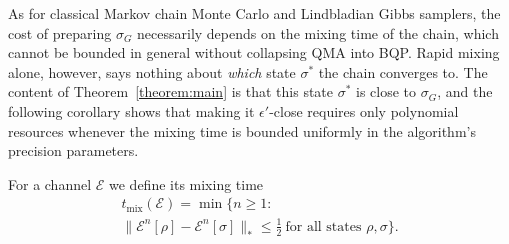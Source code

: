 \documentclass[aps,floatfix,10pt,amssymb,amsfont,amsmath,superscriptaddress,float,nofootinbib,longbibliography,nobalancelastpage,twocolumn]{revtex4-2}
\begin{document}
As for classical Markov chain Monte Carlo and Lindbladian Gibbs samplers, the cost of preparing $\sigma_G$ necessarily depends on the mixing time of the chain, which cannot be bounded in general without collapsing QMA into BQP. Rapid mixing alone, however, says nothing about \emph{which} state $\sigma^*$ the chain converges to. The content of Theorem~\ref{theorem:main} is that this state $\sigma^*$ is close to $\sigma_G$, and the following corollary shows that making it $\epsilon'$-close requires only polynomial resources whenever the mixing time is bounded uniformly in the algorithm's precision parameters.

For a channel $\mathcal{E}$ we define its mixing time
\begin{multline}
    t_{\mathrm{mix}}(\mathcal{E})=\min\Big\{n\geq1:\ \\\|\mathcal{E}^n[\rho]-\mathcal{E}^n[\sigma]\|_*\leq\tfrac12\ \text{for all states }\rho,\sigma\Big\}.
\end{multline}
\end{document}
